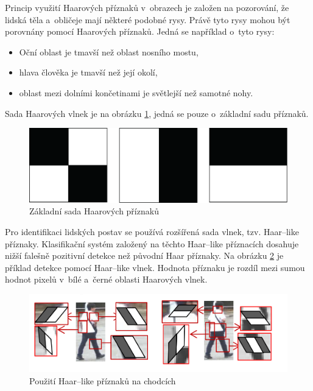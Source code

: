 Princip využití Haarových příznaků v~obrazech je založen na pozorování, že lidská těla a~obličeje mají některé podobné rysy. Právě tyto rysy mohou být porovnány pomocí Haarových příznaků. Jedná se například o~tyto rysy:
\begin{itemize}
  \item{Oční oblast je tmavší než oblast nosního mostu,}
  \item{hlava člověka je tmavší než její okolí,}
  \item{oblast mezi dolními končetinami je světlejší než samotné nohy.}
\end{itemize}
Sada Haarových vlnek je na obrázku \ref{fig:basichaarfeatures}, jedná se pouze o~základní sadu příznaků.
\begin{figure}[H]
\centering
\includegraphics[width=.4\linewidth]{assets/9_haar_features}
\caption{Základní sada Haarových příznaků}
\label{fig:basichaarfeatures}
\end{figure}

Pro identifikaci lidských postav se používá rozšířená sada vlnek, tzv. Haar--like příznaky. Klasifikační systém založený na těchto Haar--like příznacích dosahuje nižší falešně pozitivní detekce než původní Haar příznaky. Na obrázku \ref{fig:haarlike} je příklad detekce pomocí Haar--like vlnek. Hodnota příznaku je rozdíl mezi sumou hodnot pixelů v~bílé a~černé oblasti Haarových vlnek.
\begin{figure}[H]
\centering
\includegraphics[width=.8\linewidth]{assets/9_haar-like}
\caption{Použití Haar--like příznaků na chodcích}
\label{fig:haarlike}
\end{figure}

